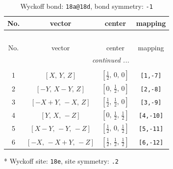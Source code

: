 \documentclass[fleqn,8pt]{jsarticle}
\begin{document}
\renewcommand{\arraystretch}{1.2}
\begin{longtable}{cccc}
\caption{Wyckoff bond: {\tt 18a@18d}, bond symmetry: {\tt -1}}
 \\
 \hline \hline
No. & vector & center & mapping \\ \hline \endfirsthead

\multicolumn{3}{l}{\tablename\ \thetable{}} \\
 \hline \hline
No. & vector & center & mapping \\ \hline \endhead

 \hline \hline
\multicolumn{3}{r}{\footnotesize\it continued ...} \\ \endfoot

 \hline \hline
\multicolumn{3}{r}{} \\ \endlastfoot

1 & $\left[ X,\, Y,\, Z \right]$ & $\left[ \frac{1}{2},\, 0,\, 0 \right]$ & {\tt [1,-7]} \\ \hline
2 & $\left[ - Y,\, X - Y,\, Z \right]$ & $\left[ 0,\, \frac{1}{2},\, 0 \right]$ & {\tt [2,-8]} \\ \hline
3 & $\left[ - X + Y,\, - X,\, Z \right]$ & $\left[ \frac{1}{2},\, \frac{1}{2},\, 0 \right]$ & {\tt [3,-9]} \\ \hline
4 & $\left[ Y,\, X,\, - Z \right]$ & $\left[ 0,\, \frac{1}{2},\, \frac{1}{2} \right]$ & {\tt [4,-10]} \\ \hline
5 & $\left[ X - Y,\, - Y,\, - Z \right]$ & $\left[ \frac{1}{2},\, 0,\, \frac{1}{2} \right]$ & {\tt [5,-11]} \\ \hline
6 & $\left[ - X,\, - X + Y,\, - Z \right]$ & $\left[ \frac{1}{2},\, \frac{1}{2},\, \frac{1}{2} \right]$ & {\tt [6,-12]} \\
\end{longtable}
* Wyckoff site: {\tt 18e}, site symmetry: {\tt .2}
\renewcommand{\arraystretch}{1.2}
\end{document}
